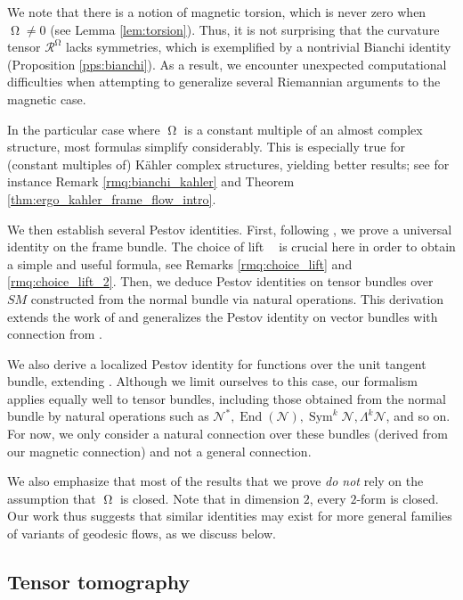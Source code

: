 \documentclass[12pt]{amsart}
\numberwithin{numbering}{section}
\theoremstyle{plain}
\theoremstyle{definition}
\theoremstyle{remark}
\numberwithin{equation}{section}
\DeclareMathOperator{\End}{End}
\DeclareMathOperator{\Sym}{Sym}
\DeclareMathOperator{\xs}{\mathbb{X}^{\mg}}
\DeclareMathOperator{\mg}{\Omega}
\begin{document}
We note that there is a notion of magnetic torsion, which is never zero when $\mg \neq 0$ (see Lemma \ref{lem:torsion}). Thus, it is not surprising that the curvature tensor $\mathcal{R}^{\mg}$ lacks symmetries, which is exemplified by a nontrivial Bianchi identity (Proposition \ref{pps:bianchi}). As a result, we encounter unexpected computational difficulties when attempting to generalize several Riemannian arguments to the magnetic case.

In the particular case where $\mg$ is a constant multiple of an almost complex structure, most formulas simplify considerably. This is especially true for (constant multiples of) Kähler complex structures, yielding better results; see for instance Remark \ref{rmq:bianchi_kahler} and Theorem \ref{thm:ergo_kahler_frame_flow_intro}.

\medskip

We then establish several Pestov identities. First, following \cite{cekic2025pestov}, we prove a universal identity on the frame bundle. The choice of lift $\xs$ is crucial here in order to obtain a simple and useful formula, see Remarks \ref{rmq:choice_lift} and \ref{rmq:choice_lift_2}. Then, we deduce Pestov identities on tensor bundles over $SM$ constructed from the normal bundle via natural operations. This derivation extends the work of \cite{cekic2025pestov} and generalizes the Pestov identity on vector bundles with connection from \cite{guillarmou2016xray}. 

We also derive a localized Pestov identity for functions over the unit tangent bundle, extending \cite{guillarmou2016xray}. Although we limit ourselves to this case, our formalism applies equally well to tensor bundles, including those obtained from the normal bundle by natural operations such as $\mathcal{N}^*, \End(\mathcal{N}), \Sym^k \mathcal{N}, \Lambda^k \mathcal{N}$, and so on. For now, we only consider a natural connection over these bundles (derived from our magnetic connection) and not a general connection.

\medskip

We also emphasize that most of the results that we prove \emph{do not} rely on the assumption that $\mg$ is closed. Note that in dimension $2$, every $2$-form is closed. Our work thus suggests that similar identities may exist for more general families of variants of geodesic flows, as we discuss below.

\subsection{Tensor tomography}
\end{document}
